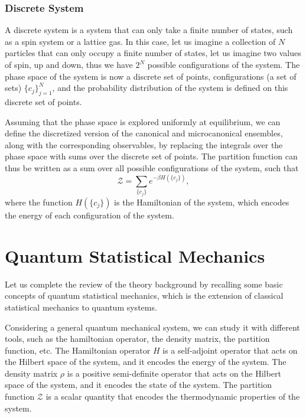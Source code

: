 \subsubsection{Discrete System}

A discrete system is a system that can only take a finite number of states, such as a spin system or a lattice gas. In this case, let us imagine a collection of \(N\) particles that can only occupy a finite number of states, let us imagine two values of spin, up and down, thus we have \(2^N\) possible configurations of the system. The phase space of the system is now a discrete set of points, configurations (a set of sets) \(\{c_j\}_{j=1}^N\), and the probability distribution of the system is defined on this discrete set of points.

Assuming that the phase space is explored uniformly at equilibrium, we can define the discretized version of the canonical and microcanonical ensembles, along with the corresponding observables, by replacing the integrals over the phase space with sums over the discrete set of points. The partition function can thus be written as a sum over all possible configurations of the system, such that
\begin{equation}
    \mathcal{Z} = \sum_{\{c_j\}} e^{-\beta H(\{c_j\})},
    \label{eq:discrete_partition_function}
\end{equation}
where the function \(H(\{c_j\})\) is the Hamiltonian of the system, which encodes the energy of each configuration of the system.

\section{Quantum Statistical Mechanics}

Let us complete the review of the theory background by recalling some basic concepts of quantum statistical mechanics, which is the extension of classical statistical mechanics to quantum systems.

Considering a general quantum mechanical system, we can study it with different tools, such as the hamiltonian operator, the density matrix, the partition function, etc. The Hamiltonian operator \(H\) is a self-adjoint operator that acts on the Hilbert space of the system, and it encodes the energy of the system. The density matrix \(\rho\) is a positive semi-definite operator that acts on the Hilbert space of the system, and it encodes the state of the system. The partition function \(\mathcal{Z}\) is a scalar quantity that encodes the thermodynamic properties of the system.

